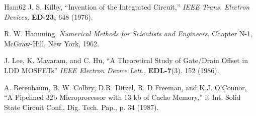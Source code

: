 \documentclass{wileySix}
\begin{document}
\begin{references}{Ham62}
J. S. Kilby,
``Invention of the Integrated Circuit,'' {\it IEEE Trans. Electron Devices,}
{\bf ED-23,} 648 (1976).

R. W. Hamming,
                 {\it Numerical Methods for Scientists and
                 Engineers}, Chapter N-1, McGraw-Hill,
                 New York, 1962.

J. Lee, K. Mayaram, and C. Hu, ``A Theoretical
               Study of Gate/Drain Offset in LDD MOSFETs''
                     {\it IEEE Electron Device Lett.,} {\bf EDL-7}(3). 152
                     (1986).

A. Berenbaum,
B. W. Colbry, D.R. Ditzel, R. D Freeman, and
K.J. O'Connor, ``A Pipelined 32b Microprocessor with 13 kb of Cache Memory,''
{it Int. Solid State Circuit Conf., Dig. Tech. Pap.,} p. 34 (1987).

\end{references}



\printindex


\end{document}
